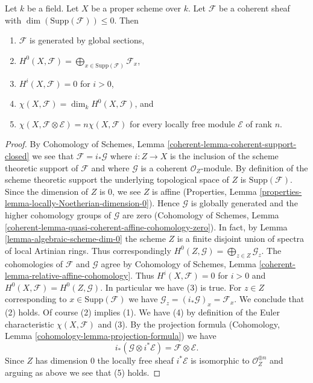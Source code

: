 \begin{lemma}
\label{lemma-chi-tensor-finite}
Let $k$ be a field. Let $X$ be a proper scheme over $k$. Let $\mathcal{F}$
be a coherent sheaf with $\dim(\text{Supp}(\mathcal{F})) \leq 0$.
Then
\begin{enumerate}
\item $\mathcal{F}$ is generated by global sections,
\item $H^0(X, \mathcal{F}) =
\bigoplus_{x \in \text{Supp}(\mathcal{F})} \mathcal{F}_x$,
\item $H^i(X, \mathcal{F}) = 0$ for $i > 0$,
\item $\chi(X, \mathcal{F}) = \dim_k H^0(X, \mathcal{F})$, and
\item
$\chi(X, \mathcal{F} \otimes \mathcal{E}) = n\chi(X, \mathcal{F})$
for every locally free module $\mathcal{E}$ of rank $n$.
\end{enumerate}
\end{lemma}

\begin{proof}
By Cohomology of Schemes, Lemma \ref{coherent-lemma-coherent-support-closed}
we see that $\mathcal{F} = i_*\mathcal{G}$ where $i : Z \to X$ is the inclusion
of the scheme theoretic support of $\mathcal{F}$ and where $\mathcal{G}$
is a coherent $\mathcal{O}_Z$-module. By definition of the scheme theoretic
support the underlying topological space of $Z$ is $\text{Supp}(\mathcal{F})$.
Since the dimension of $Z$ is $0$, we see $Z$ is affine (Properties, Lemma
\ref{properties-lemma-locally-Noetherian-dimension-0}).
Hence $\mathcal{G}$ is globally generated and the higher
cohomology groups of $\mathcal{G}$ are zero
(Cohomology of Schemes, Lemma
\ref{coherent-lemma-quasi-coherent-affine-cohomology-zero}).
In fact, by Lemma \ref{lemma-algebraic-scheme-dim-0}
the scheme $Z$ is a finite disjoint union of spectra
of local Artinian rings. Thus correspondingly
$H^0(Z, \mathcal{G}) = \bigoplus_{z \in Z} \mathcal{G}_z$.
The cohomologies of $\mathcal{F}$ and $\mathcal{G}$ agree by
Cohomology of Schemes, Lemma \ref{coherent-lemma-relative-affine-cohomology}.
Thus $H^i(X, \mathcal{F}) = 0$ for $i > 0$ and
$H^0(X, \mathcal{F}) = H^0(Z, \mathcal{G})$.
In particular we have (3) is true.
For $z \in Z$ corresponding to $x \in \text{Supp}(\mathcal{F})$
we have $\mathcal{G}_z = (i_*\mathcal{G})_x = \mathcal{F}_x$.
We conclude that (2) holds. Of course (2) implies (1).
We have (4) by definition of the Euler characteristic $\chi(X, \mathcal{F})$
and (3). By the projection formula
(Cohomology, Lemma \ref{cohomology-lemma-projection-formula}) we have
$$
i_*(\mathcal{G} \otimes i^*\mathcal{E}) = \mathcal{F} \otimes \mathcal{E}.
$$
Since $Z$ has dimension $0$ the locally free sheaf $i^*\mathcal{E}$
is isomorphic to $\mathcal{O}_Z^{\oplus n}$ and arguing as above
we see that (5) holds.
\end{proof}

